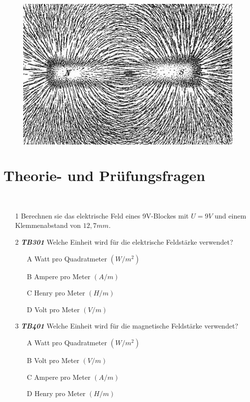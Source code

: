 \begin{figure}
 \vspace{-7.5cm}
  \includegraphics[scale=0.35]{Felder/Bilder/Magnet.jpg}
 \vspace{-7.5cm}
\end{figure}

\section{Theorie- und Prüfungsfragen}

~~~~~~
\begin{enumerate} 
\itemsep1pt\parskip0pt
\item[1] Berechnen sie das elektrische Feld eines 9V-Blockes mit $U = 9V$ und einem Klemmenabstand von $12,7mm$.
\end{enumerate}


\begin{enumerate} 
\itemsep1pt\parskip0pt
\item[2] \emph{\textbf{TB301}} Welche Einheit wird für die elektrische Feldstärke verwendet?
	\begin{enumerate}
	\itemsep1pt\parskip0pt
		\item[A] Watt pro Quadratmeter $(W/m^2)$
		\item[B] Ampere pro Meter $(A/m)$
		\item[C] Henry pro Meter $(H/m)$
		\item[D] Volt pro Meter $(V/m)$
	\end{enumerate}
\end{enumerate}

\begin{enumerate} 
\itemsep1pt\parskip0pt
\item[3] \emph{\textbf{TB401}} Welche Einheit wird für die magnetische Feldstärke verwendet?
	\begin{enumerate}
	\itemsep1pt\parskip0pt
		\item[A] Watt pro Quadratmeter $(W/m^2)$
		\item[B] Volt pro Meter $(V/m)$
		\item[C] Ampere pro Meter $(A/m)$
		\item[D] Henry pro Meter $(H/m)$
	\end{enumerate}
\end{enumerate}



